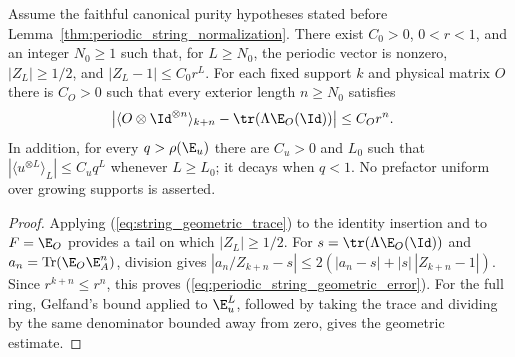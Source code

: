 \begin{lemma}
    \label{thm:periodic_string_geometric_expectations}
    \leanok
    Assume the faithful canonical purity hypotheses stated before
    Lemma~\ref{thm:periodic_string_normalization}. There exist
    $C_0>0$, $0<r<1$, and an integer $N_0\geq1$ such that, for
    $L\geq N_0$, the periodic vector is nonzero, $|Z_L|\geq1/2$,
    and $|Z_L-1|\leq C_0r^L$.
    For each fixed support $k$ and physical matrix $O$ there is $C_O>0$
    such that every exterior length $n\geq N_0$ satisfies
    \begin{align}
        \big|\langle O\otimes\Id^{\otimes n}\rangle_{k+n}
        -\tr(\Lambda\E_O(\Id))\big|
         & \leq C_O r^n.
        \label{eq:periodic_string_geometric_error}
    \end{align}
    In addition, for every $q>\rho(\E_u)$ there are $C_u>0$ and
    $L_0$ such that $|\langle u^{\otimes L}\rangle_L|\leq C_u q^L$
    whenever $L\geq L_0$; it decays when $q<1$.
    No prefactor uniform over growing supports is asserted.
\end{lemma}
\begin{proof}
    Applying (\ref{eq:string_geometric_trace}) to the identity insertion
    and to $F=\E_O$ provides a tail on which $|Z_L|\geq1/2$.
    For $s=\tr(\Lambda\E_O(\Id))$ and
    $a_n=\operatorname{Tr}(\E_O\E_A^n)$, division gives
    $|a_n/Z_{k+n}-s|\leq2(|a_n-s|+|s|\,|Z_{k+n}-1|)$.
    Since $r^{k+n}\leq r^n$, this proves
    (\ref{eq:periodic_string_geometric_error}). For the full ring, Gelfand's
    bound applied to $\E_u^L$, followed by taking the trace and dividing by
    the same denominator bounded away from zero, gives the geometric estimate.
\end{proof}
